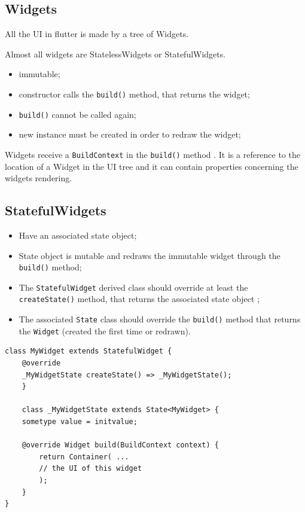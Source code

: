 \subsection{Widgets}
All the UI in flutter is made by a tree of Widgets. 

Almost all widgets are StatelessWidgets or StatefulWidgets.

\begin{itemize}
    \item immutable;
    \item constructor calls the \texttt{build()} method, that returns the widget;
    \item \texttt{build()} cannot be called again;
    \item new instance must be created in order to redraw the widget;
\end{itemize}

Widgets receive a \texttt{BuildContext} in the \texttt{build()} method .
It is a reference to the location of a Widget in the UI tree and it can contain 
properties concerning the widgets rendering.

\subsection{StatefulWidgets}


\begin{itemize}
    \item Have an associated state object;
    \item State object is mutable and redraws the immutable widget through the \texttt{build()} method;
    \item The \texttt{StatefulWidget} derived class should override at least the 
    \texttt{createState()} method, that returns the associated state object ;
    \item The associated \texttt{State} class should override the \texttt{build()}
    method that returns the \texttt{Widget} (created the first time or redrawn).
\end{itemize}

\begin{lstlisting}
class MyWidget extends StatefulWidget { 
    @override 
    _MyWidgetState createState() => _MyWidgetState(); 
    } 
    
    class _MyWidgetState extends State<MyWidget> { 
    sometype value = initvalue; 
        
    @override Widget build(BuildContext context) { 
        return Container( ...
        // the UI of this widget 
        ); 
    }
}
\end{lstlisting}

